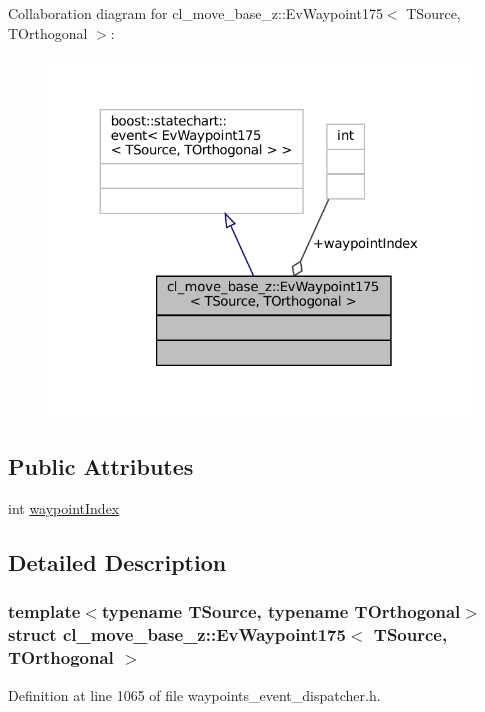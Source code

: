 Collaboration diagram for cl\+\_\+move\+\_\+base\+\_\+z\+:\+:Ev\+Waypoint175$<$ T\+Source, T\+Orthogonal $>$\+:
\nopagebreak
\begin{figure}[H]
\begin{center}
\leavevmode
\includegraphics[width=324pt]{structcl__move__base__z_1_1EvWaypoint175__coll__graph}
\end{center}
\end{figure}
\subsection*{Public Attributes}
\begin{DoxyCompactItemize}
\item 
int \hyperlink{structcl__move__base__z_1_1EvWaypoint175_a576c5ba9ca97dc1f7dbd88ea95f1221c}{waypoint\+Index}
\end{DoxyCompactItemize}


\subsection{Detailed Description}
\subsubsection*{template$<$typename T\+Source, typename T\+Orthogonal$>$\newline
struct cl\+\_\+move\+\_\+base\+\_\+z\+::\+Ev\+Waypoint175$<$ T\+Source, T\+Orthogonal $>$}



Definition at line 1065 of file waypoints\+\_\+event\+\_\+dispatcher.\+h.




